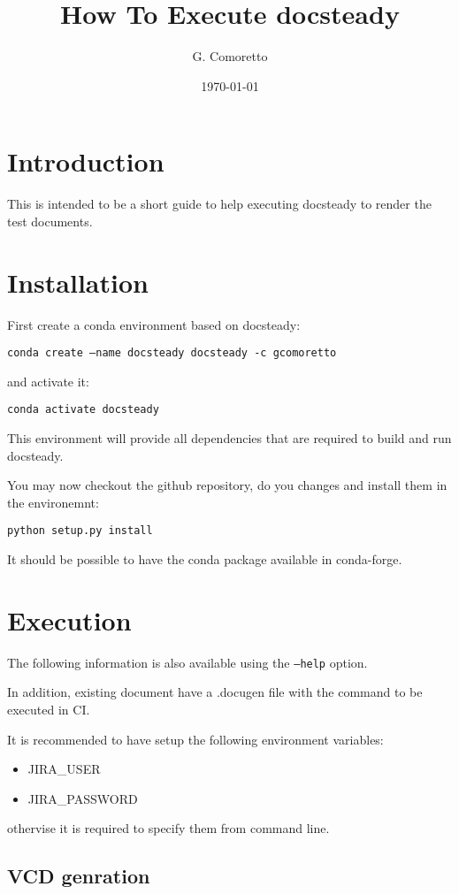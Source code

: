 \documentclass[DM]{lsstdoc}
\author{G. Comoretto}
\begin{document}
\date{\today}

\title{How To Execute docsteady}
\mkshorttitle

\section{Introduction}

This is intended to be a short guide to help executing docsteady to render the test documents.


\section{Installation}

First create a conda environment based on docsteady:

\texttt{conda create --name docsteady docsteady -c gcomoretto}

and activate it:

\texttt{conda activate docsteady}

This environment will provide all dependencies that are required to build and run docsteady.

You may now checkout the github repository, do you changes and install them in the environemnt:

\texttt{python setup.py install}

It should be possible to have the conda package available in conda-forge.


\section{Execution}

The following information is also available using the \texttt{--help} option.

In addition, existing document have a .docugen file with the command to be executed in CI.

It is recommended to have setup the following environment variables:

\begin{itemize}
\item JIRA\_USER
\item JIRA\_PASSWORD
\end{itemize}

othervise it is required to specify them from command line.


\subsection{VCD genration}
\end{document}
